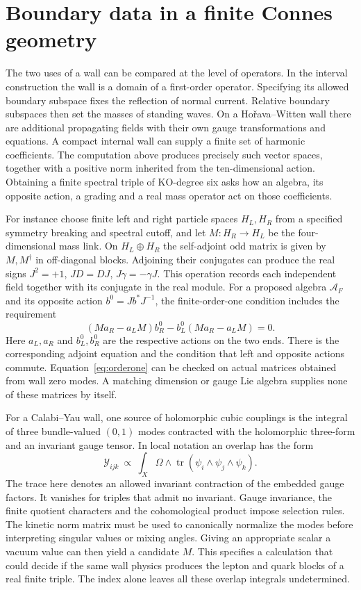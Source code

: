 \documentclass[aps,prd,reprint,onecolumn,nofootinbib,amsmath,amssymb]{revtex4-2}
\begin{document}
\section{Boundary data in a finite Connes geometry}
The two uses of a wall can be compared at the level of operators. In the interval construction the wall is a domain of a first-order operator. Specifying its allowed boundary subspace fixes the reflection of normal current. Relative boundary subspaces then set the masses of standing waves. On a Ho\v{r}ava--Witten wall there are additional propagating fields with their own gauge transformations and equations. A compact internal wall can supply a finite set of harmonic coefficients. The computation above produces precisely such vector spaces, together with a positive norm inherited from the ten-dimensional action. Obtaining a finite spectral triple of KO-degree six asks how an algebra, its opposite action, a grading and a real mass operator act on those coefficients.

For instance choose finite left and right particle spaces $H_L,H_R$ from a specified symmetry breaking and spectral cutoff, and let $M:H_R\to H_L$ be the four-dimensional mass link. On $H_L\oplus H_R$ the self-adjoint odd matrix is given by $M,M^\dagger$ in off-diagonal blocks. Adjoining their conjugates can produce the real signs $J^2=+1$, $JD=DJ$, $J\gamma=-\gamma J$. This operation records each independent field together with its conjugate in the real module. For a proposed algebra $\mathcal A_F$ and its opposite action $b^0=Jb^*J^{-1}$, the finite-order-one condition includes the requirement
\begin{equation}
 (M a_R-a_L M)b_R^0
       -b_L^0(M a_R-a_L M)=0 .
 \label{eq:orderone}
\end{equation}
Here $a_L,a_R$ and $b_L^0,b_R^0$ are the respective actions on the two ends. There is the corresponding adjoint equation and the condition that left and opposite actions commute. Equation~\eqref{eq:orderone} can be checked on actual matrices obtained from wall zero modes. A matching dimension or gauge Lie algebra supplies none of these matrices by itself.

For a Calabi--Yau wall, one source of holomorphic cubic couplings is the integral of three bundle-valued $(0,1)$ modes contracted with the holomorphic three-form and an invariant gauge tensor. In local notation an overlap has the form
\begin{equation}
 \mathcal Y_{ijk}\ \propto\
  \int_X\Omega\wedge\operatorname{tr}
         (\psi_i\wedge\psi_j\wedge\psi_k).
\end{equation}
The trace here denotes an allowed invariant contraction of the embedded gauge factors. It vanishes for triples that admit no invariant. Gauge invariance, the finite quotient characters and the cohomological product impose selection rules. The kinetic norm matrix must be used to canonically normalize the modes before interpreting singular values or mixing angles. Giving an appropriate scalar a vacuum value can then yield a candidate $M$. This specifies a calculation that could decide if the same wall physics produces the lepton and quark blocks of a real finite triple. The index alone leaves all these overlap integrals undetermined.
\end{document}
